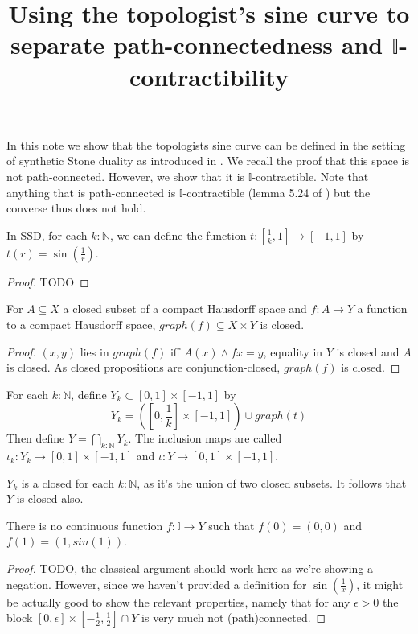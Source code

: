 \documentclass{../util/zariski}
\title{Using the topologist's sine curve to separate path-connectedness and $\mathbb I$-contractibility}
\begin{document}
In this note we show that the topologists sine curve can be defined in the setting of 
synthetic Stone duality as introduced in \cite{synthetic-stone-duality}. 
We recall the proof that this space is not path-connected. 
However, we show that it is $\mathbb I$-contractible. 
Note that anything that is path-connected is $\mathbb I$-contractible 
(lemma 5.24 of \cite{synthetic-stone-duality})
but the converse thus does not hold. 

\begin{lemma}
  In SSD, for each $k:\mathbb N$, we can define the function 
  $t:[\frac1k, 1] \to [-1,1]$ by $t(r) = \sin(\frac1r)$.
\end{lemma}
\begin{proof}
  TODO
\end{proof}
\begin{lemma}
  For $A\subseteq X$ a closed subset of a compact Hausdorff space and 
  $f: A \to Y$ a function to a compact Hausdorff space, 
  $graph(f) \subseteq X \times Y$ is closed. 
\end{lemma}
\begin{proof}
  $(x,y)$ lies in $graph(f)$ iff $A(x) \wedge f x = y$, 
  equality in $Y$ is closed and $A$ is closed. 
  As closed propositions are conjunction-closed, $graph(f)$ is closed. 
\end{proof}
\begin{definition}
  For each $k:\mathbb N$, define $Y_k \subset [0,1] \times [-1,1]$ by 
  $$Y_k = ([0, \frac1k] \times [-1,1]) \cup graph(t)$$
  Then define $Y = \bigcap_{k:\mathbb N} Y_k$. 
  The inclusion maps are called $\iota_k : Y_k \to [0,1] \times [-1,1]$ 
  and $\iota:Y \to [0,1] \times [-1,1]$. 
\end{definition}
\begin{remark}
  $Y_k$ is a closed for each $k:\mathbb N$, 
  as it's the union of two closed subsets. 
  It follows that $Y$ is closed also. 
\end{remark}
\begin{lemma}
  There is no continuous function $f:\mathbb I \to Y$ such that $f(0) = (0,0)$ and 
  $f(1) = (1,sin(1))$. 
\end{lemma}
\begin{proof}
  TODO, the classical argument should work here as we're showing a negation.
  However, since we haven't provided a definition for $\sin(\frac1x)$, 
  it might be actually good to show the relevant properties, namely that 
  for any $\epsilon>0$ the block $[0,\epsilon] \times [-\frac12,\frac12]\cap Y$
  is very much not (path)connected.
\end{proof}
\end{document}
